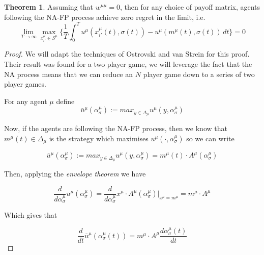 \documentclass{article}
\theoremstyle{definition}
\newtheorem{theorem}{Theorem}
\begin{document}

	\begin{theorem}
		Assuming that $w^{\mu \mu} = 0$, then for any choice of payoff matrix, agents following the NA-FP process achieve zero regret in the limit, i.e.
		\begin{equation}
			\lim_{T \rightarrow \infty} \max_{x_{i'}^\mu \in S^\mu} \Big\{ \frac{1}{T} \int_{0}^{T} u^{\mu}(x_{i'}^\mu(t), \sigma(t)) - u^{\mu}(m^\mu(t), \sigma(t)) \, dt \Big\} = 0
		\end{equation}

	\end{theorem}
	
	\begin{proof}
		We will adapt the techniques of Ostrovski and van Strein for this proof. Their result was found for a two player game, we will leverage the fact that the NA process means that we can reduce an $N$ player game down to a series of two player games. 
		
		For any agent $\mu$ define
		\begin{equation}
			\bar{u}^\mu (\alpha_\sigma^\mu) := max_{y \in \Delta_\mu} u^\mu(y, \alpha_\sigma^\mu)
		\end{equation}

		Now, if the agents are following the NA-FP process, then we know that $m^\mu (t) \in \Delta_\mu$ is the strategy which maximises $u^\mu( \cdot, \alpha_\sigma^\mu)$ so we can write 

		\begin{equation}
			\bar{u}^\mu (\alpha_\sigma^\mu) := max_{y \in \Delta_\mu} u^\mu(y, \alpha_\sigma^\mu) = m^\mu(t) \cdot A^\mu (\alpha_\sigma^\mu)
		\end{equation}

		Then, applying the \emph{envelope theorem} we have

		\begin{equation}
			\frac{d}{d \alpha_\sigma^\mu} \bar{u}^\mu (\alpha_\sigma^\mu) = \frac{d}{d \alpha_\sigma^\mu} x^\mu \cdot A^\mu (\alpha_\sigma^\mu) \Big |_{x^\mu = m^\mu} = m^\mu \cdot A^\mu
		\end{equation}

		Which gives that 

		\begin{equation}
			\frac{d}{dt} \bar{u}^\mu (\alpha_\sigma^\mu (t)) = m^\mu \cdot A^\mu \frac{d \alpha_\sigma^\mu (t)}{dt}
		\end{equation}


\end{proof}
\end{document}
